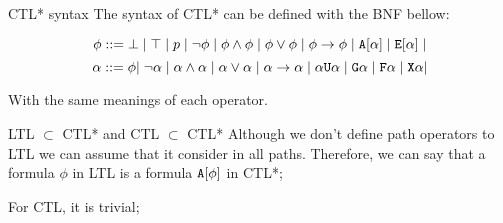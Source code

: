 \begin{frame}{CTL* syntax}
    The syntax of CTL* can be defined with the BNF bellow:
    
    	$$\phi ::= \bot \; | \; \top \; | \; p \; | \; \neg \phi \; | \; \phi \land \phi \; | \; \phi \lor \phi \; | \; \phi \to \phi \; | \; \texttt{A}[\alpha] \; | \; \texttt{E}[\alpha] \; | $$
        $$\alpha ::= \phi |  \; \neg \alpha \; | \; \alpha \land \alpha \; | \; \alpha \lor \alpha \; | \; \alpha \to \alpha \; | \; \alpha \texttt{U} \alpha \; | \; \texttt{G} \alpha \; | \; \texttt{F} \alpha \; | \; \texttt{X}\alpha |$$
        
        With the same meanings of each operator.
\end{frame}

\begin{frame}{LTL $\subset$ CTL* and CTL $\subset$ CTL*}
    Although we don't define path operators to LTL we can assume that it consider in all paths. Therefore, we can say that a formula $\phi$ in LTL is a formula $\texttt{A}[\phi]$ in CTL*;\pause
    
    For CTL, it is trivial;
\end{frame}

